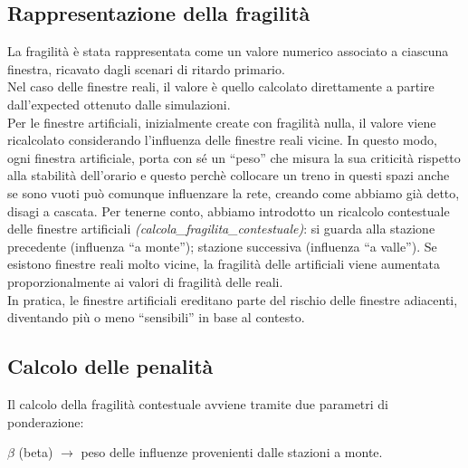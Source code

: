 \documentclass{report}
\begin{document}
\subsection{Rappresentazione della fragilità}
La fragilità è stata rappresentata come un valore numerico associato a ciascuna finestra, ricavato dagli scenari di ritardo primario. \\ Nel caso delle finestre reali, il valore è quello calcolato direttamente a partire dall’expected ottenuto dalle simulazioni. \\ Per le finestre artificiali, inizialmente create con fragilità nulla, il valore viene ricalcolato considerando l’influenza delle finestre reali vicine. In questo modo, ogni finestra artificiale, porta con sé un “peso” che misura la sua criticità rispetto alla stabilità dell’orario e questo perchè collocare un treno in questi spazi anche se sono vuoti può comunque influenzare la rete, creando come abbiamo già detto, disagi a cascata.
Per tenerne conto, abbiamo introdotto un ricalcolo contestuale delle finestre artificiali \textit{(calcola\_fragilita\_contestuale)}: si guarda alla stazione precedente (influenza “a monte”); stazione successiva (influenza “a valle”). Se esistono finestre reali molto vicine, la fragilità delle artificiali viene aumentata proporzionalmente ai valori di fragilità delle reali. \\ In pratica, le finestre artificiali ereditano parte del rischio delle finestre adiacenti, diventando più o meno “sensibili” in base al contesto.

\subsection{Calcolo delle penalità}
Il calcolo della fragilità contestuale avviene tramite due parametri di ponderazione:

$\beta$ (beta) $\rightarrow$ peso delle influenze provenienti dalle stazioni a monte.
\end{document}
